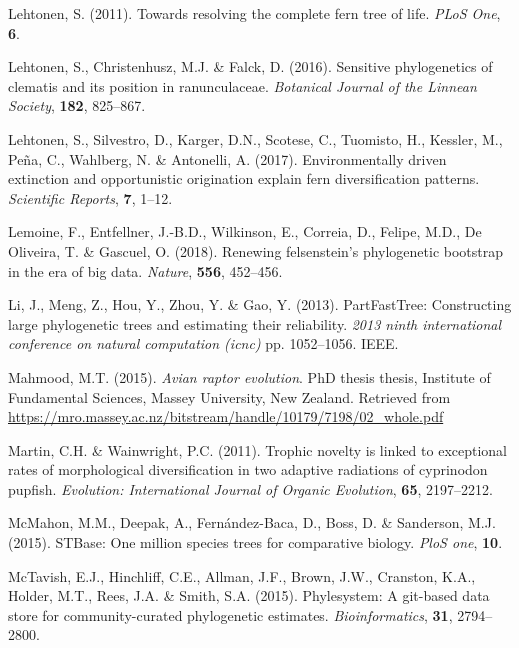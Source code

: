 \documentclass[]{article}
\begin{document}
\leavevmode\hypertarget{ref-lehtonen2011towards}{}%
Lehtonen, S. (2011). Towards resolving the complete fern tree of life. \emph{PLoS One}, \textbf{6}.

\leavevmode\hypertarget{ref-lehtonen2016sensitive}{}%
Lehtonen, S., Christenhusz, M.J. \& Falck, D. (2016). Sensitive phylogenetics of clematis and its position in ranunculaceae. \emph{Botanical Journal of the Linnean Society}, \textbf{182}, 825--867.

\leavevmode\hypertarget{ref-lehtonen2017environmentally}{}%
Lehtonen, S., Silvestro, D., Karger, D.N., Scotese, C., Tuomisto, H., Kessler, M., Peña, C., Wahlberg, N. \& Antonelli, A. (2017). Environmentally driven extinction and opportunistic origination explain fern diversification patterns. \emph{Scientific Reports}, \textbf{7}, 1--12.

\leavevmode\hypertarget{ref-lemoine2018renewing}{}%
Lemoine, F., Entfellner, J.-B.D., Wilkinson, E., Correia, D., Felipe, M.D., De Oliveira, T. \& Gascuel, O. (2018). Renewing felsenstein's phylogenetic bootstrap in the era of big data. \emph{Nature}, \textbf{556}, 452--456.

\leavevmode\hypertarget{ref-li2013partfasttree}{}%
Li, J., Meng, Z., Hou, Y., Zhou, Y. \& Gao, Y. (2013). PartFastTree: Constructing large phylogenetic trees and estimating their reliability. \emph{2013 ninth international conference on natural computation (icnc)} pp. 1052--1056. IEEE.

\leavevmode\hypertarget{ref-mahmood2015avian}{}%
Mahmood, M.T. (2015). \emph{Avian raptor evolution}. PhD thesis thesis, Institute of Fundamental Sciences, Massey University, New Zealand. Retrieved from \url{https://mro.massey.ac.nz/bitstream/handle/10179/7198/02_whole.pdf}

\leavevmode\hypertarget{ref-martin2011trophic}{}%
Martin, C.H. \& Wainwright, P.C. (2011). Trophic novelty is linked to exceptional rates of morphological diversification in two adaptive radiations of cyprinodon pupfish. \emph{Evolution: International Journal of Organic Evolution}, \textbf{65}, 2197--2212.

\leavevmode\hypertarget{ref-mcmahon2015stbase}{}%
McMahon, M.M., Deepak, A., Fernández-Baca, D., Boss, D. \& Sanderson, M.J. (2015). STBase: One million species trees for comparative biology. \emph{PloS one}, \textbf{10}.

\leavevmode\hypertarget{ref-mctavish2015phylesystem}{}%
McTavish, E.J., Hinchliff, C.E., Allman, J.F., Brown, J.W., Cranston, K.A., Holder, M.T., Rees, J.A. \& Smith, S.A. (2015). Phylesystem: A git-based data store for community-curated phylogenetic estimates. \emph{Bioinformatics}, \textbf{31}, 2794--2800.
\end{document}
